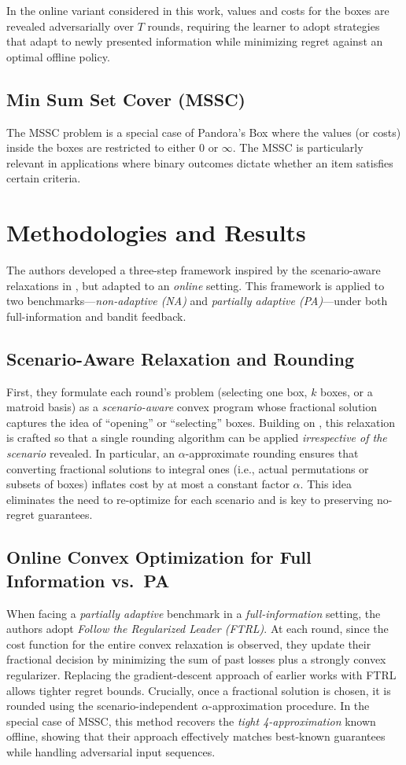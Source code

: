 \documentclass[11pt,a4paper]{article}
\begin{document}
In the online variant considered in this work, values and costs for the boxes are revealed adversarially over \( T \) rounds, requiring the learner to adopt strategies that adapt to newly presented information while minimizing regret against an optimal offline policy.

\subsection{Min Sum Set Cover (MSSC)}
The MSSC problem is a special case of Pandora’s Box where the values (or costs) inside the boxes are restricted to either \( 0 \) or \( \infty \). The MSSC is particularly relevant in applications where binary outcomes dictate whether an item satisfies certain criteria.
\pagebreak


\section{Methodologies and Results}
The authors developed a three-step framework inspired by the scenario-aware relaxations in \cite{CGT+20}, but adapted to an \emph{online} setting. This framework is applied to two benchmarks---\emph{non-adaptive (NA)} and \emph{partially adaptive (PA)}---under both full-information and bandit feedback.

\subsection*{Scenario-Aware Relaxation and Rounding}
First, they formulate each round’s problem (selecting one box, $k$ boxes, or a matroid basis) as a \emph{scenario-aware} convex program whose fractional solution captures the idea of ``opening'' or ``selecting'' boxes. Building on \cite{CGT+20}, this relaxation is crafted so that a single rounding algorithm can be applied \emph{irrespective of the scenario} revealed. In particular, an $\alpha$-approximate rounding ensures that converting fractional solutions to integral ones (i.e., actual permutations or subsets of boxes) inflates cost by at most a constant factor $\alpha$. This idea eliminates the need to re-optimize for each scenario and is key to preserving no-regret guarantees.

\subsection*{Online Convex Optimization for Full Information vs.\ PA}
When facing a \emph{partially adaptive} benchmark in a \emph{full-information} setting, the authors adopt \emph{Follow the Regularized Leader (FTRL)}. At each round, since the cost function for the entire convex relaxation is observed, they update their fractional decision by minimizing the sum of past losses plus a strongly convex regularizer. Replacing the gradient-descent approach of earlier works with FTRL allows tighter regret bounds. Crucially, once a fractional solution is chosen, it is rounded using the scenario-independent $\alpha$-approximation procedure. In the special case of MSSC, this method recovers the \emph{tight 4-approximation} known offline, showing that their approach effectively matches best-known guarantees while handling adversarial input sequences.
\end{document}
